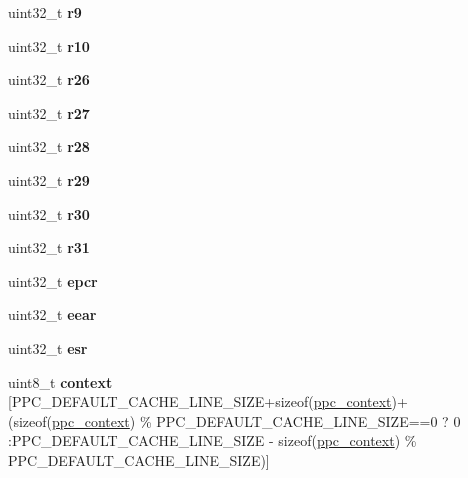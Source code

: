 \begin{DoxyCompactItemize}
uint32\+\_\+t {\bfseries r9}
\item 
\mbox{\label{structContext__Control_a6aa2ac6b22c6e6ca2f335cbe46a16fd5}} 
uint32\+\_\+t {\bfseries r10}
\item 
\mbox{\label{structContext__Control_a1f60cb946e4667a43480cb6052b203fa}} 
uint32\+\_\+t {\bfseries r26}
\item 
\mbox{\label{structContext__Control_a6b503f2a27fb69b516a5912e1faa1b25}} 
uint32\+\_\+t {\bfseries r27}
\item 
\mbox{\label{structContext__Control_a6cd47ba5c5e9603300deb4621ff0d6ff}} 
uint32\+\_\+t {\bfseries r28}
\item 
\mbox{\label{structContext__Control_a0ce26ee86ad61c6a13b99c75540ba37e}} 
uint32\+\_\+t {\bfseries r29}
\item 
\mbox{\label{structContext__Control_a2d62d5babf98a4f91fdbb0f8a791b766}} 
uint32\+\_\+t {\bfseries r30}
\item 
\mbox{\label{structContext__Control_a3942393c731fde00730e0cd68094b6d1}} 
uint32\+\_\+t {\bfseries r31}
\item 
\mbox{\label{structContext__Control_a755b6dd79ccc8e97d36d420e1fa35e4a}} 
uint32\+\_\+t {\bfseries epcr}
\item 
\mbox{\label{structContext__Control_a7569ae7dd88fa844dcbae7c62e2fd0bd}} 
uint32\+\_\+t {\bfseries eear}
\item 
\mbox{\label{structContext__Control_a5c38e99ed916d3ee4d20ef23f8627ce9}} 
uint32\+\_\+t {\bfseries esr}
\item 
\mbox{\label{structContext__Control_a5777ad99db6ad10b79264648a01f8d28}} 
uint8\+\_\+t {\bfseries context} \mbox{[}P\+P\+C\+\_\+\+D\+E\+F\+A\+U\+L\+T\+\_\+\+C\+A\+C\+H\+E\+\_\+\+L\+I\+N\+E\+\_\+\+S\+I\+ZE+sizeof(\mbox{\hyperlink{structppc__context}{ppc\+\_\+context}})+(sizeof(\mbox{\hyperlink{structppc__context}{ppc\+\_\+context}}) \% P\+P\+C\+\_\+\+D\+E\+F\+A\+U\+L\+T\+\_\+\+C\+A\+C\+H\+E\+\_\+\+L\+I\+N\+E\+\_\+\+S\+I\+ZE==0 ? 0 \+:P\+P\+C\+\_\+\+D\+E\+F\+A\+U\+L\+T\+\_\+\+C\+A\+C\+H\+E\+\_\+\+L\+I\+N\+E\+\_\+\+S\+I\+ZE -\/ sizeof(\mbox{\hyperlink{structppc__context}{ppc\+\_\+context}}) \% P\+P\+C\+\_\+\+D\+E\+F\+A\+U\+L\+T\+\_\+\+C\+A\+C\+H\+E\+\_\+\+L\+I\+N\+E\+\_\+\+S\+I\+ZE)\mbox{]}

\end{DoxyCompactItemize}
